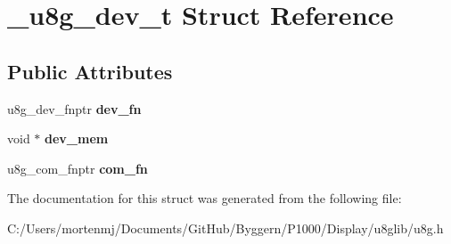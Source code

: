 \hypertarget{struct__u8g__dev__t}{\section{\-\_\-u8g\-\_\-dev\-\_\-t Struct Reference}
\label{struct__u8g__dev__t}
}
\subsection*{Public Attributes}
\begin{DoxyCompactItemize}
\item 
\hypertarget{struct__u8g__dev__t_afe13b5e72116088ffc2aae053d58d8f5}{u8g\-\_\-dev\-\_\-fnptr {\bfseries dev\-\_\-fn}}\label{struct__u8g__dev__t_afe13b5e72116088ffc2aae053d58d8f5}

\item 
\hypertarget{struct__u8g__dev__t_a9154631197f2a82fc077187e0a8a21e3}{void $\ast$ {\bfseries dev\-\_\-mem}}\label{struct__u8g__dev__t_a9154631197f2a82fc077187e0a8a21e3}

\item 
\hypertarget{struct__u8g__dev__t_a2bf6f0b0dcff43013c412178e6c3fb42}{u8g\-\_\-com\-\_\-fnptr {\bfseries com\-\_\-fn}}\label{struct__u8g__dev__t_a2bf6f0b0dcff43013c412178e6c3fb42}

\end{DoxyCompactItemize}


The documentation for this struct was generated from the following file\-:\begin{DoxyCompactItemize}
\item 
C\-:/\-Users/mortenmj/\-Documents/\-Git\-Hub/\-Byggern/\-P1000/\-Display/u8glib/u8g.\-h\end{DoxyCompactItemize}
